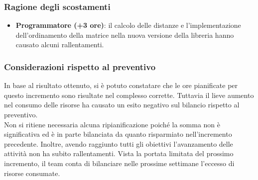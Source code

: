 \subsubsection{Ragione degli scostamenti}

\begin{itemize}
\item \textbf{Programmatore (+3 ore)}: il calcolo delle distanze e l'implementazione dell'ordinamento della matrice nella nuova versione della libreria  hanno causato alcuni rallentamenti. 
\end{itemize}

\subsubsection{Considerazioni rispetto al preventivo}

In base al risultato ottenuto, si è potuto constatare che le ore pianificate per questo incremento sono risultate nel complesso corrette. Tuttavia il lieve aumento nel consumo delle risorse ha causato un esito negativo sul bilancio rispetto al preventivo.\\
Non si ritiene necessaria alcuna ripianificazione poiché la somma non è significativa ed è in parte bilanciata da quanto risparmiato nell’incremento precedente. Inoltre, avendo raggiunto tutti gli obiettivi l'avanzamento delle attività non ha subito rallentamenti. Vista la portata limitata del prossimo incremento, il team conta di bilanciare nelle prossime settimane l'eccesso di risorse consumate.

\newpage

